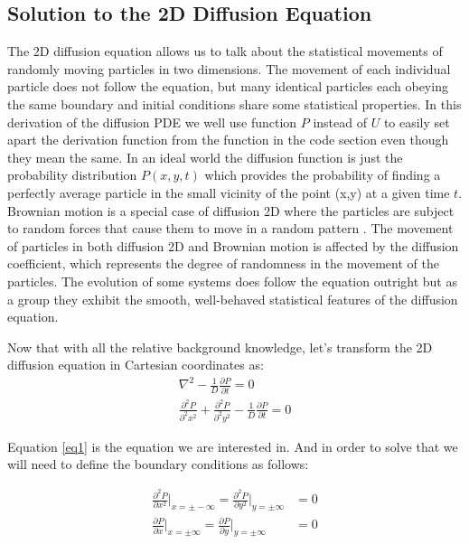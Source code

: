 \subsection{Solution to the 2D Diffusion Equation}

The 2D diffusion equation allows us to talk about the statistical movements of randomly moving particles in two dimensions. The movement of each individual particle does not follow the equation, but many identical particles each obeying the same boundary and initial conditions share some statistical properties. In this derivation of the diffusion PDE we well use function $P$ instead of $U$ to easily set apart the derivation function from the function in the code section even though they mean the same. 
In an ideal world the diffusion function is just the probability distribution $P(x,y,t)$ which provides the probability of finding a perfectly average particle in the small vicinity of the point (x,y) at a given time $t$. Brownian motion is a special case of diffusion 2D where the particles are subject to random forces that cause them to move in a random pattern \cite{Ursell2005}. The movement of particles in both diffusion 2D and Brownian motion is affected by the diffusion coefficient, which represents the degree of randomness in the movement of the particles. The evolution of some systems does follow the equation outright but as a group they exhibit the smooth, well-behaved statistical features of the diffusion equation.

Now that with all the relative background knowledge, let's transform the 2D diffusion equation in Cartesian coordinates as:
\begin{align*}
    \nabla^2 - \frac{1}{D} \frac{\partial P}{ \partial t} = 0 \\
    \frac{\partial^2 P}{ \partial^2 x^2} + \frac{\partial^2 P}{ \partial^2 y^2}  - \frac{1}{D} \frac{\partial P}{ \partial t} = 0 \tag{1}
    \label{eq1}
\end{align*}


Equation \eqref{eq1} is the equation we are interested in. And in order to solve that we will need to define the boundary conditions as follows:

\begin{align*}
   \frac{\partial^2 P}{\partial x^2} \bigg \vert_{x = \pm -\infty} = \frac{\partial^2 P}{\partial y^2} \bigg \vert_{y= \pm \infty} &= 0 \\
   \frac{\partial P}{\partial x} \bigg \vert_{x= \pm \infty} = \frac{\partial P}{\partial y} \bigg \vert_{y= \pm \infty} &= 0 \tag{B.C}
    \label{bc1}
\end{align*}

